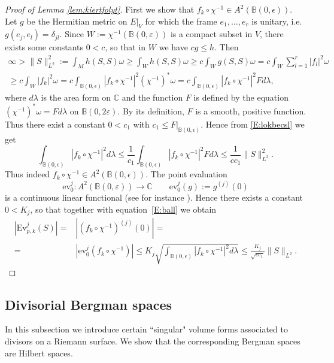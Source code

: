 \documentclass[11pt]{amsart}
\theoremstyle{definition}
\newcommand{\bC}{{\mathbb C}}
\begin{document}
  \begin{proof}[Proof of Lemma \ref{lem:kiertfolyt}]
      First we show that $f_k\circ\chi^{-1}\in A^2(\mathbb B(0,\epsilon))$.
      Let $g$ be the Hermitian metric on
      $\left. E\right|_V$ for which the frame $e_1,\dots,e_r$ is unitary, i.e. $g(e_j,e_l)=\delta_{jl}$. 
    Since $W:=\chi^{-1}(\mathbb B(0,\varepsilon))$ is a compact subset in $V$, there exists some constants 
     $0<c$, so that in $W$ we have $cg\le h$.  Then           
     \begin{equation}\label{E:lokbecsl}
     \begin{split}
\infty>\|S\|^2_{L^2}:=
\int_Mh(S,S)\omega
\ge\int_Wh(S,S)\omega\ge
c\int_Wg(S,S)\omega=
c\int_W\sum^r_{l=1}|f_l|^2\omega
 \\
\ge c\int_W|f_k|^2\omega
=c\int_{\mathbb B(0,\epsilon)}|f_k\circ\chi^{-1}|^2
(\chi^{-1})^*\omega=c
\int_{\mathbb B(0,\epsilon)}
|f_k\circ\chi^{-1}|^2 Fd\lambda,
\end{split}
     \end{equation}
     where $d\lambda$ is the area form on $\bC$ and the function $F$ is defined by the equation $(\chi^{-1})^*\omega=Fd\lambda$ on $\mathbb B(0,2\varepsilon)$. By its definition, $F$ is a smooth, positive  function. Thus there exist a  constant $0<c_1$ with $c_1\le \left.F\right|_{\mathbb B(0,\epsilon)}$. Hence from \eqref{E:lokbecsl} we get
 \begin{equation}\label{E:ball}     
  \int_{\mathbb B(0,\epsilon)}
|f_k\circ\chi^{-1}|^2d\lambda\le
\frac1{c_1}
\int_{\mathbb B(0,\epsilon)}
|f_k\circ\chi^{-1}|^2 Fd\lambda
\le \frac1{cc_1}\|S\|^2_{L^2}.
\end{equation}
Thus indeed $f_k\circ\chi^{-1}\in A^2(\mathbb B(0,\epsilon))$.
The point evaluation 
$$
\text{ev}^j_0:A^2(\mathbb B(0,\varepsilon))\rightarrow\bC
\qquad
\text{ev}^j_0(g):=g^{(j)}(0)
$$ is a continuous linear functional   (see for instance \cite{HKZ}).
Hence there exists a constant $0<K_j$, so that together with equation~\eqref{E:ball}
we obtain
\begin{align*}
    |\text{Ev}^j_{p,k}(S)|=& |(f_k\circ\chi^{-1})^{(j)}(0)|=\\
    =& |\text{ev}^j_0(f_k\circ\chi^{-1})|\le K_j\sqrt{\int_{\mathbb B(0,\epsilon)}
    |f_k\circ\chi^{-1}|^2 d\lambda}\le\frac{K_j}{\sqrt{cc_1}}\|S\|_{L^2}.
\end{align*}
\end{proof}

\subsection{Divisorial Bergman spaces}\label{ss:divbergman} In this subsection we introduce certain ``singular" volume forms associated to divisors on a Riemann surface. We show that the corresponding Bergman spaces are Hilbert spaces.
\end{document}
